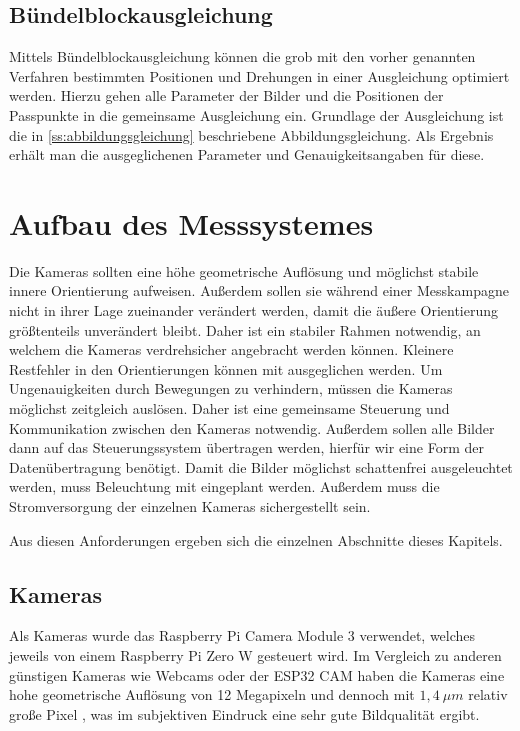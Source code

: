 \documentclass[a4paper,12pt,bibliography=totoc, listof=totoc,titlepage]{scrreprt}
\begin{document}
\section{Bündelblockausgleichung}
Mittels Bündelblockausgleichung können die grob mit den vorher genannten Verfahren bestimmten Positionen und Drehungen in einer Ausgleichung optimiert werden. Hierzu gehen alle Parameter der Bilder und die Positionen der Passpunkte in die gemeinsame Ausgleichung ein. Grundlage der Ausgleichung ist die in \autoref{ss:abbildungsgleichung} beschriebene Abbildungsgleichung. Als Ergebnis erhält man die ausgeglichenen Parameter und Genauigkeitsangaben für diese. \citep[S. 340]{luhmann4}

\chapter{Aufbau des Messsystemes}
Die Kameras sollten eine höhe geometrische Auflösung und möglichst stabile innere Orientierung aufweisen. Außerdem sollen sie während einer Messkampagne nicht in ihrer Lage zueinander verändert werden, damit die äußere Orientierung größtenteils unverändert bleibt. Daher ist ein stabiler Rahmen notwendig, an welchem die Kameras verdrehsicher angebracht werden können. Kleinere Restfehler in den Orientierungen können mit ausgeglichen werden.
Um Ungenauigkeiten durch Bewegungen zu verhindern, müssen die Kameras möglichst zeitgleich auslösen. Daher ist eine gemeinsame Steuerung und Kommunikation zwischen den Kameras notwendig. Außerdem sollen alle Bilder dann auf das Steuerungssystem übertragen werden, hierfür wir eine Form der Datenübertragung benötigt. Damit die Bilder möglichst schattenfrei ausgeleuchtet werden, muss Beleuchtung mit eingeplant werden. Außerdem muss die Stromversorgung der einzelnen Kameras sichergestellt sein.

Aus diesen Anforderungen ergeben sich die einzelnen Abschnitte dieses Kapitels.

\section{Kameras}
Als Kameras wurde das Raspberry Pi Camera Module 3 verwendet, welches jeweils von einem Raspberry Pi Zero W gesteuert wird. Im Vergleich zu anderen günstigen Kameras wie Webcams oder der ESP32 CAM haben die Kameras eine hohe geometrische Auflösung von 12 Megapixeln und dennoch mit $1,4~\mu m$ relativ große Pixel \citep{raspi_cam_datasheet}, was im subjektiven Eindruck eine sehr gute Bildqualität ergibt.
\end{document}
